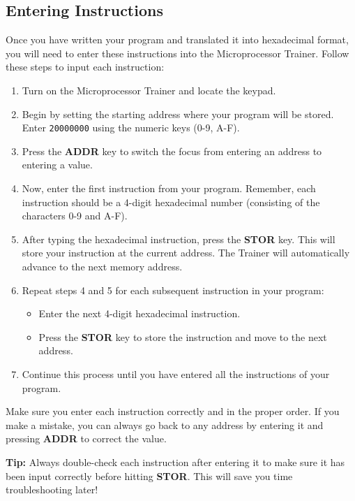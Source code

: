\documentclass[12pt]{article}
\begin{document}
\subsection{Entering Instructions}

Once you have written your program and translated it into hexadecimal format, you will need to enter these instructions into the Microprocessor Trainer. Follow these steps to input each instruction:

\begin{enumerate}
    \item Turn on the Microprocessor Trainer and locate the keypad.
    \item Begin by setting the starting address where your program will be stored. Enter \texttt{20000000} using the numeric keys (0-9, A-F).
    \item Press the \textbf{ADDR} key to switch the focus from entering an address to entering a value.
    \item Now, enter the first instruction from your program. Remember, each instruction should be a 4-digit hexadecimal number (consisting of the characters 0-9 and A-F).
    \item After typing the hexadecimal instruction, press the \textbf{STOR} key. This will store your instruction at the current address. The Trainer will automatically advance to the next memory address.
    \item Repeat steps 4 and 5 for each subsequent instruction in your program:
        \begin{itemize}
            \item Enter the next 4-digit hexadecimal instruction.
            \item Press the \textbf{STOR} key to store the instruction and move to the next address.
        \end{itemize}
    \item Continue this process until you have entered all the instructions of your program.
\end{enumerate}

Make sure you enter each instruction correctly and in the proper order. If you make a mistake, you can always go back to any address by entering it and pressing \textbf{ADDR} to correct the value.

\textbf{Tip:} Always double-check each instruction after entering it to make sure it has been input correctly before hitting \textbf{STOR}. This will save you time troubleshooting later!
\end{document}
